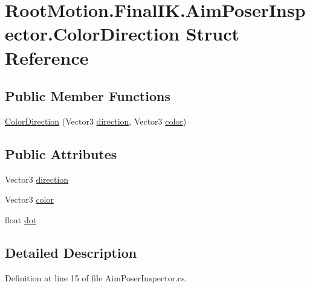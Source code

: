 \hypertarget{struct_root_motion_1_1_final_i_k_1_1_aim_poser_inspector_1_1_color_direction}{}\section{Root\+Motion.\+Final\+I\+K.\+Aim\+Poser\+Inspector.\+Color\+Direction Struct Reference}
\label{struct_root_motion_1_1_final_i_k_1_1_aim_poser_inspector_1_1_color_direction}
\subsection*{Public Member Functions}
\begin{DoxyCompactItemize}
\item 
\mbox{\hyperlink{struct_root_motion_1_1_final_i_k_1_1_aim_poser_inspector_1_1_color_direction_a05088eaf6bca7ba943cd6fcc0d12e23d}{Color\+Direction}} (Vector3 \mbox{\hyperlink{struct_root_motion_1_1_final_i_k_1_1_aim_poser_inspector_1_1_color_direction_aea388b61500e09a16d528ea9b64471a8}{direction}}, Vector3 \mbox{\hyperlink{struct_root_motion_1_1_final_i_k_1_1_aim_poser_inspector_1_1_color_direction_a523d85a18d6040398b5ab134c04ae11f}{color}})
\end{DoxyCompactItemize}
\subsection*{Public Attributes}
\begin{DoxyCompactItemize}
\item 
Vector3 \mbox{\hyperlink{struct_root_motion_1_1_final_i_k_1_1_aim_poser_inspector_1_1_color_direction_aea388b61500e09a16d528ea9b64471a8}{direction}}
\item 
Vector3 \mbox{\hyperlink{struct_root_motion_1_1_final_i_k_1_1_aim_poser_inspector_1_1_color_direction_a523d85a18d6040398b5ab134c04ae11f}{color}}
\item 
float \mbox{\hyperlink{struct_root_motion_1_1_final_i_k_1_1_aim_poser_inspector_1_1_color_direction_ac6fd6b19ac36bc323fd7ad43e3e19297}{dot}}
\end{DoxyCompactItemize}


\subsection{Detailed Description}


Definition at line 15 of file Aim\+Poser\+Inspector.\+cs.



